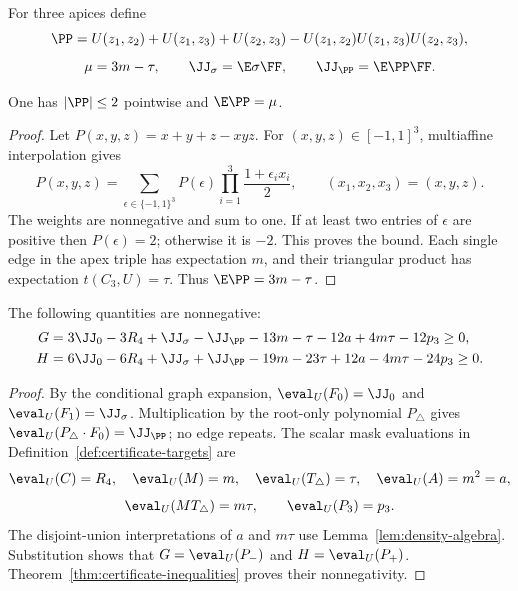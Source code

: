 \begin{definition}
\label{def:majority}
For three apices define
\[
 \PP=U(z_1,z_2)+U(z_1,z_3)+U(z_2,z_3)
       -U(z_1,z_2)U(z_1,z_3)U(z_2,z_3),
\]
\[
 \mu=3m-\tau,\qquad
 \JJ_\sigma=\E\sigma\FF,\qquad
 \JJ_{\PP}=\E\PP\FF.
\]
\end{definition}

\begin{lemma}
\label{lem:majority-bounds}
\proved One has $|\PP|\le2$ pointwise and $\E\PP=\mu$.
\end{lemma}
\begin{proof}
Let $P(x,y,z)=x+y+z-xyz$.  For $(x,y,z)\in[-1,1]^3$, multiaffine interpolation gives
\[
 P(x,y,z)=\sum_{\epsilon\in\{-1,1\}^3}P(\epsilon)
              \prod_{i=1}^3\frac{1+\epsilon_i x_i}{2},
 \qquad (x_1,x_2,x_3)=(x,y,z).
\]
The weights are nonnegative and sum to one.  If at least two entries of $\epsilon$ are
positive then $P(\epsilon)=2$; otherwise it is $-2$.  This proves the bound.
Each single edge in the apex triple has expectation $m$, and their triangular product has
expectation $t(C_3,U)=\tau$.  Thus $\E\PP=3m-\tau$.
\end{proof}

\begin{lemma}
\label{lem:GH}
\proved The following quantities are nonnegative:
\begin{align}
 G={}&3\JJ_0-3R_4+\JJ_\sigma-\JJ_{\PP}
       -13m-\tau-12a+4m\tau-12p_3\ge0,\label{eq:blueprint-G}\\
 H={}&6\JJ_0-6R_4+\JJ_\sigma+\JJ_{\PP}
       -19m-23\tau+12a-4m\tau-24p_3\ge0.\label{eq:blueprint-H}
\end{align}
\end{lemma}
\begin{proof}
By the conditional graph expansion,
$\eval_U(F_0)=\JJ_0$ and $\eval_U(F_1)=\JJ_\sigma$.  Multiplication by the root-only
polynomial $P_\triangle$ gives
$\eval_U(P_\triangle\cdot F_0)=\JJ_{\PP}$; no edge repeats.
The scalar mask evaluations in Definition~\ref{def:certificate-targets} are
\[
 \eval_U(C)=R_4,\quad \eval_U(M)=m,\quad
 \eval_U(T_\triangle)=\tau,\quad\eval_U(A)=m^2=a,
\]
\[
 \eval_U(MT_\triangle)=m\tau,\qquad\eval_U(P_3)=p_3.
\]
The disjoint-union interpretations of $a$ and $m\tau$ use
Lemma~\ref{lem:density-algebra}.  Substitution shows that $G=\eval_U(P_-)$ and
$H=\eval_U(P_+)$.  Theorem~\ref{thm:certificate-inequalities} proves their nonnegativity.
\end{proof}

